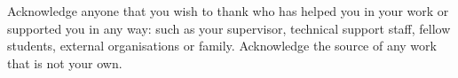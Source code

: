 Acknowledge anyone that you wish to thank who has helped you in your work or 
supported you in any way: such as your supervisor, technical support staff, 
fellow students, external organisations or family. Acknowledge the source of 
any work that is not your own.
